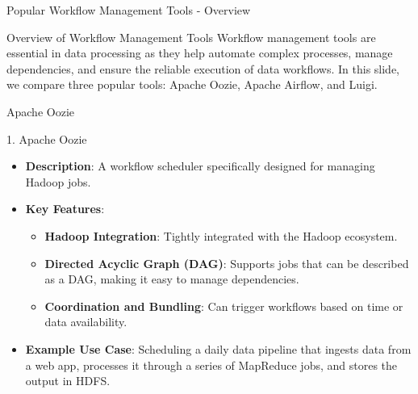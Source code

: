 \documentclass[aspectratio=169]{beamer}
\begin{document}
\begin{frame}[fragile]{Popular Workflow Management Tools - Overview}
    \begin{block}{Overview of Workflow Management Tools}
        Workflow management tools are essential in data processing as they help automate complex processes, manage dependencies, and ensure the reliable execution of data workflows. In this slide, we compare three popular tools: Apache Oozie, Apache Airflow, and Luigi.
    \end{block}
\end{frame}

\begin{frame}[fragile]{Apache Oozie}
    \begin{block}{1. Apache Oozie}
        \begin{itemize}
            \item \textbf{Description}: A workflow scheduler specifically designed for managing Hadoop jobs. 
            \item \textbf{Key Features}:
                \begin{itemize}
                    \item \textbf{Hadoop Integration}: Tightly integrated with the Hadoop ecosystem.
                    \item \textbf{Directed Acyclic Graph (DAG)}: Supports jobs that can be described as a DAG, making it easy to manage dependencies.
                    \item \textbf{Coordination and Bundling}: Can trigger workflows based on time or data availability.
                \end{itemize}
            \item \textbf{Example Use Case}: Scheduling a daily data pipeline that ingests data from a web app, processes it through a series of MapReduce jobs, and stores the output in HDFS.
        \end{itemize}
    \end{block}
\end{frame}
\end{document}
